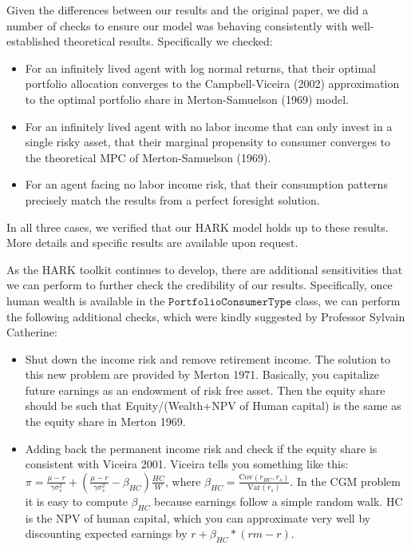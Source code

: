 \documentclass[./CGMPort.tex]{subfiles}
\begin{document}
Given the differences between our results and the original paper, we did a number of checks to ensure our model was behaving consistently with well-established theoretical results. Specifically we checked:
\begin{itemize}
	\item For an infinitely lived agent with log normal returns, that their optimal portfolio allocation converges to the Campbell-Viceira (2002) approximation to the optimal portfolio share in Merton-Samuelson (1969) model.
	\item For an infinitely lived agent with no labor income that can only invest in a single risky asset, that their marginal propensity to consumer converges to the theoretical MPC of Merton-Samuelson (1969).
	\item For an agent facing no labor income risk, that their consumption patterns precisely match the results from a perfect foresight solution.
\end{itemize}

In all three cases, we verified that our HARK model holds up to these results. More details and specific results are available upon request. 

As the HARK toolkit continues to develop, there are additional sensitivities that we can perform to further check the credibility of our results. Specifically, once human wealth is available in the $\texttt{PortfolioConsumerType}$ class, we can perform the following additional checks, which were kindly suggested by Professor Sylvain Catherine:
\begin{itemize}
	\item Shut down the income risk and remove retirement income. The solution to this new problem are provided by Merton 1971. Basically, you capitalize future earnings as an endowment of risk free asset. Then the equity share should be such that Equity/(Wealth+NPV of Human capital) is the same as the equity share in Merton 1969.
	\item Adding back the permanent income risk and check if the equity share is consistent with Viceira 2001. Viceira tells you something like this: $\pi = \frac{\mu - r}{\gamma \sigma^2_s} + \left(\frac{\mu - r}{\gamma \sigma^2_s} - \beta_{HC} \right) \frac{HC}{W}$, where $\beta_{HC} = \frac{\text{Cov}(r_{HC},r_s)}{\text{Var}(r_s)}$. In the CGM problem it is easy to compute $\beta_{HC}$ because earnings follow a simple random walk. HC is the NPV of human capital, which you can approximate very well by discounting expected earnings by $r+\beta_{HC}*(rm-r)$.
\end{itemize}

\clearpage\vfill\eject

\onlyinsubfile{}
\end{document}
